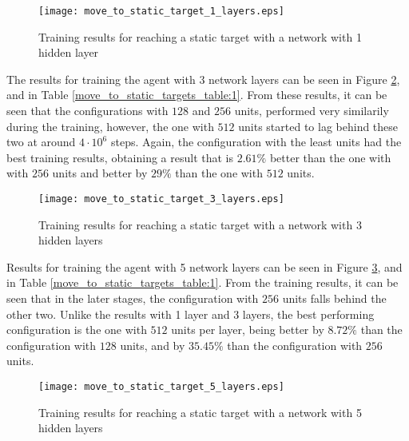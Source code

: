 \begin{figure}
    \begin{center}
        \texttt{[image: move\_to\_static\_target\_1\_layers.eps]}
        \caption{Training results for reaching a static target with a network with 1 hidden layer}
        \label{train_results_static_1_layers}
    \end{center}
\end{figure}


The results for training the agent with 3 network layers can be seen in Figure \ref{train_results_static_3_layers}, and in Table \ref{move_to_static_targets_table:1}. From these results, it can be seen that the configurations with $128$ and $256$ units, performed very similarily during the training, however, the one with $512$ units started to lag behind these two at around $4 \cdot 10^6$ steps. Again, the configuration with the least units had the best training results, obtaining a result that is $2.61\%$ better than the one with with $256$ units and better by $29\%$ than the one with $512$ units. 

\begin{figure}
    \begin{center}
        \texttt{[image: move\_to\_static\_target\_3\_layers.eps]}
        \caption{Training results for reaching a static target with a network with 3 hidden layers}
        \label{train_results_static_3_layers}
    \end{center}
\end{figure}


Results for training the agent with 5 network layers can be seen in Figure \ref{train_results_static_5_layers}, and in Table \ref{move_to_static_targets_table:1}. From the training results, it can be seen that in the later stages, the configuration with $256$ units falls behind the other two. Unlike the results with 1 layer and 3 layers, the best performing configuration is the one with $512$ units per layer, being better by $8.72\%$ than the configuration with $128$ units, and by $35.45\%$ than the configuration with $256$ units.

\begin{figure}
    \begin{center}
        \texttt{[image: move\_to\_static\_target\_5\_layers.eps]}
        \caption{Training results for reaching a static target with a network with 5 hidden layers}
        \label{train_results_static_5_layers}
    \end{center}
\end{figure}

